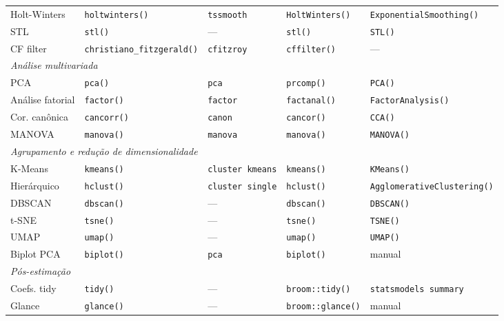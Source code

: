 {\begin{longtable}{lllll}
Holt-Winters    & \texttt{holtwinters()} & \texttt{tssmooth}   & \texttt{HoltWinters()} & \texttt{ExponentialSmoothing()} \\
STL             & \texttt{stl()}        & —                     & \texttt{stl()}         & \texttt{STL()} \\
CF filter       & \texttt{christiano\_fitzgerald()} & \texttt{cfitzroy} & \texttt{cffilter()} & — \\
\midrule
\multicolumn{5}{l}{\textit{Análise multivariada}} \\
PCA             & \texttt{pca()}        & \texttt{pca}          & \texttt{prcomp()}      & \texttt{PCA()} \\
Análise fatorial & \texttt{factor()}    & \texttt{factor}       & \texttt{factanal()}    & \texttt{FactorAnalysis()} \\
Cor. canônica   & \texttt{cancorr()}    & \texttt{canon}        & \texttt{cancor()}      & \texttt{CCA()} \\
MANOVA          & \texttt{manova()}     & \texttt{manova}       & \texttt{manova()}      & \texttt{MANOVA()} \\
\midrule
\multicolumn{5}{l}{\textit{Agrupamento e redução de dimensionalidade}} \\
K-Means         & \texttt{kmeans()}     & \texttt{cluster kmeans} & \texttt{kmeans()}    & \texttt{KMeans()} \\
Hierárquico     & \texttt{hclust()}     & \texttt{cluster single} & \texttt{hclust()}    & \texttt{AgglomerativeClustering()} \\
DBSCAN          & \texttt{dbscan()}     & —                     & \texttt{dbscan()}      & \texttt{DBSCAN()} \\
t-SNE           & \texttt{tsne()}       & —                     & \texttt{tsne()}        & \texttt{TSNE()} \\
UMAP            & \texttt{umap()}       & —                     & \texttt{umap()}        & \texttt{UMAP()} \\
Biplot PCA      & \texttt{biplot()}     & \texttt{pca}          & \texttt{biplot()}      & manual \\
\midrule
\multicolumn{5}{l}{\textit{Pós-estimação}} \\
Coefs. tidy     & \texttt{tidy()}       & —                     & \texttt{broom::tidy()} & \texttt{statsmodels summary} \\
Glance          & \texttt{glance()}     & —                     & \texttt{broom::glance()} & manual \\

\end{longtable}}
